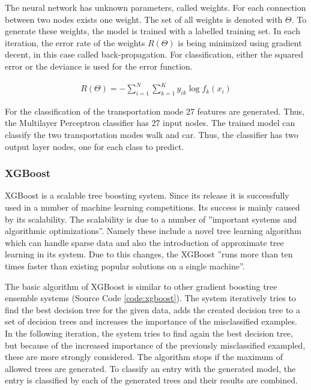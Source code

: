 The neural network has unknown parameters, called weights. For each connection between two nodes exists one weight. The set of all weights is denoted with $\Theta$. To generate these weights, the model is trained with a labelled training set. In each iteration, the error rate of the weights $R(\Theta)$ is being minimized using gradient decent, in this case called back-propagation. For classification, either the squared error or the deviance is used for the error function. \cite{hastie2005elements}

\begin{align}
    R(\Theta)=-\sum_{i=1}^N\sum_{k=1}^K y_{ik} \log f_k(x_i)
\end{align}{}

For the classification of the transportation mode 27 features are generated. Thus, the Multilayer Perceptron classifier has 27 input nodes. The trained model can classify the two transportation modes walk and car. Thus, the classifier has two output layer nodes, one for each class to predict. 


\subsubsection{XGBoost}
XGBoost is a scalable tree boosting system. Since its release it is successfully used in a number of machine learning competitions. Its success is mainly caused by its scalability. The scalability is due to a number of ''important systems and algorithmic optimizations''. Namely these include a novel tree learning algorithm which can handle sparse data and also the introduction of approximate tree learning in its system. Due to this changes, the XGBoost ''runs more than ten times faster than existing popular solutions on a single machine''.  \cite{chen2016xgboost}

The basic algorithm of XGBoost is similar to other gradient boosting tree ensemble systems (Source Code \ref{code:xgboost}). The system iteratively tries to find the best decision tree for the given data, adds the created decision tree to a set of decision trees and increases the importance of the misclassified examples. In the following iteration, the system tries to find again the best decision tree, but because of the increased importance of the previously misclassified exampled, these are more strongly considered. The algorithm stops if the maximum of allowed trees are generated. To classify an entry with the generated model, the entry is classified by each of the generated trees and their results are combined. \cite{chen2016xgboost}

